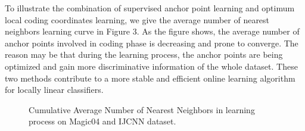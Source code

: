 \documentclass{llncs}
\begin{document}
	To illustrate the combination of supervised anchor point learning and optimum local coding coordinates learning, we give the average number of nearest neighbors learning curve in Figure 3. As the figure shows, the average number of anchor points involved in coding phase is decreasing and prone to converge. The reason may be that during the learning process, the anchor points are being optimized and gain more discriminative information of the whole dataset. These two methods contribute to a more stable and efficient online learning algorithm for locally linear classifiers.
	\begin{figure}[!tbp]
		\centering
		\hfill
		\caption{Cumulative Average Number of Nearest Neighbors in learning process on Magic04 and IJCNN dataset.}
	\end{figure}
\end{document}

